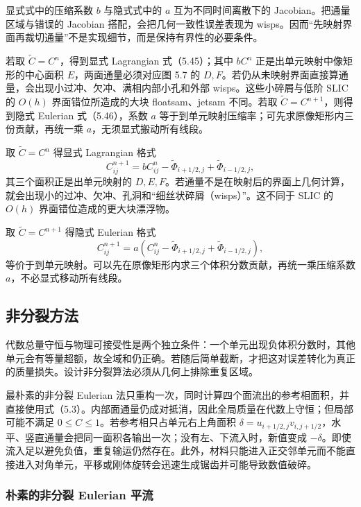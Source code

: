 \documentclass[11pt,a4paper,openany,fontset=none]{ctexbook}
\begin{document}
显式式中的压缩系数 $b$ 与隐式式中的 $a$ 互为不同时间离散下的 Jacobian。把通量区域与错误的 Jacobian 搭配，会把几何一致性误差表现为 wisps。因而“先映射界面再裁切通量”不是实现细节，而是保持有界性的必要条件。

若取 $\widetilde C=C^n$，得到显式 Lagrangian 式（5.45）；其中 $bC^n$ 正是出单元映射中像矩形的中心面积 $E$，两面通量必须对应图 5.7 的 $D,F$。若仍从未映射界面直接算通量，会出现小过冲、欠冲、满相内部小孔和外部 wisps。这些小碎屑与低阶 SLIC 的 $O(h)$ 界面错位所造成的大块 floatsam、jetsam 不同。若取 $\widetilde C=C^{n+1}$，则得到隐式 Eulerian 式（5.46），系数 $a$ 等于到单元映射压缩率；可先求原像矩形内三份贡献，再统一乘 $a$，无须显式搬动所有线段。

取 $\widetilde C=C^n$ 得显式 Lagrangian 格式
\begin{equation}
C_{ij}^{n+1}=bC_{ij}^{n}-\widetilde\Phi_{i+1/2,j}+\widetilde\Phi_{i-1/2,j},
\tag{5.45}
\end{equation}
其三个面积正是出单元映射的 $D,E,F$。若通量不是在映射后的界面上几何计算，就会出现小的过冲、欠冲、孔洞和“细丝状碎屑（wisps）”。这不同于 SLIC 的 $O(h)$ 界面错位造成的更大块漂浮物。

取 $\widetilde C=C^{n+1}$ 得隐式 Eulerian 格式
\begin{equation}
C_{ij}^{n+1}=a\left(C_{ij}^n-\widetilde\Phi_{i+1/2,j}+\widetilde\Phi_{i-1/2,j}\right),
\tag{5.46}
\end{equation}
等价于到单元映射。可以先在原像矩形内求三个体积分数贡献，再统一乘压缩系数 $a$，不必显式移动所有线段。

\subsection{非分裂方法}

代数总量守恒与物理可接受性是两个独立条件：一个单元出现负体积分数时，其他单元会有等量超额，故全域和仍正确。若随后简单截断，才把这对误差转化为真正的质量损失。设计非分裂算法必须从几何上排除重复区域。

最朴素的非分裂 Eulerian 法只重构一次，同时计算四个面流出的参考相面积，并直接使用式（5.3）。内部面通量仍成对抵消，因此全局质量在代数上守恒；但局部可能不满足 $0\le C\le1$。若参考相只占单元右上角面积 $\delta=u_{i+1/2,j}v_{i,j+1/2}$，水平、竖直通量会把同一面积各输出一次；没有左、下流入时，新值变成 $-\delta$。即使流入足以避免负值，重复输运仍然存在。此外，材料只能进入正交邻单元而不能直接进入对角单元，平移或刚体旋转会迅速生成锯齿并可能导致数值破碎。

\subsubsection{朴素的非分裂 Eulerian 平流}
\end{document}

